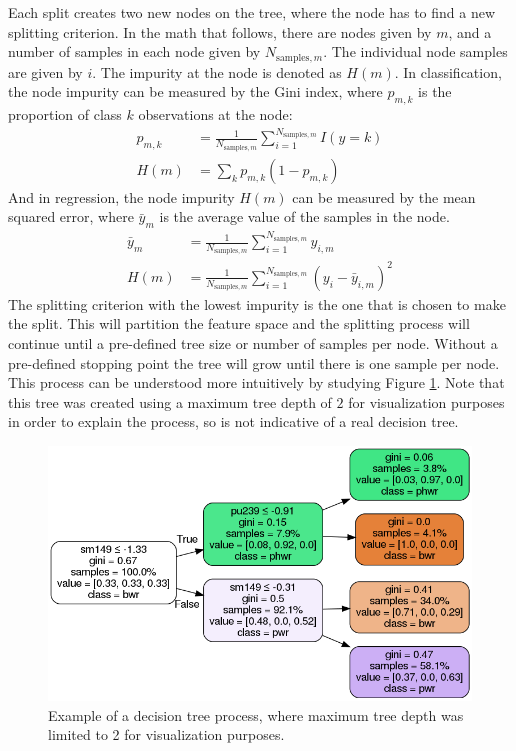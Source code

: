 Each split creates two new nodes on the tree, where the node has to find a new
splitting criterion. In the math that follows, there are nodes given by $m$,
and a number of samples in each node given by $N_{\text{samples}, m}$. The
individual node samples are given by $i$. The impurity at the node is denoted
as $H(m)$. In classification, the node impurity can be measured by the Gini
index, where $p_{m, k}$ is the proportion of class $k$ observations at the
node:
\begin{equation}
  \begin{aligned}
    p_{m, k} &= \frac{1}{N_{\text{samples}, m}} \sum_{i=1}^{N_{\text{samples}, m}}
              I(y = k)
    \\
    H(m) &= \sum_k p_{m, k} (1 - p_{m, k})
  \end{aligned}
\end{equation}
And in regression, the node impurity $H(m)$ can be measured by the mean squared
error, where $\bar{y}_m$ is the average value of the samples in the node.
\begin{equation}
  \begin{aligned}
    \bar{y}_m &= \frac{1}{N_{\text{samples}, m}} \sum_{i=1}^{N_{\text{samples}, m}} 
                 y_{i, m}
    \\
    H(m) &= \frac{1}{N_{\text{samples}, m}} \sum_{i=1}^{N_{\text{samples}, m}}
              (y_i - \bar{y}_{i, m})^2
  \end{aligned}
\end{equation}
The splitting criterion with the lowest impurity is the one that is chosen to
make the split.  This will partition the feature space and the splitting
process will continue until a pre-defined tree size or number of samples per
node. Without a pre-defined stopping point the tree will grow until there is
one sample per node. This process can be understood more intuitively by
studying Figure \ref{fig:dtr}. Note that this tree was created using a maximum
tree depth of $2$ for visualization purposes in order to explain the process,
so is not indicative of a real decision tree.

\begin{figure}[!htb]
  \centering
  \includegraphics[width=\linewidth]{./chapters/litrev/dtree.png}
  \caption{Example of a decision tree process, where maximum tree depth was 
           limited to 2 for visualization purposes.}
  \label{fig:dtr}
\end{figure}

